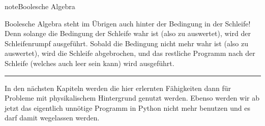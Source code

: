 \documentclass[letterpaper,10pt,english]{jupyterBook}
\begin{document}
\begin{sphinxadmonition}{note}{Boolesche Algebra}

\sphinxAtStartPar
Boolesche Algebra steht im Übrigen auch hinter der Bedingung in der \sphinxhyphen{}Schleife! Denn solange die Bedingung der Schleife wahr ist (also zu  auswertet), wird der Schleifenrumpf ausgeführt. Sobald die Bedingung nicht mehr wahr ist (also zu  auswertet), wird die Schleife abgebrochen, und das restliche Programm nach der Schleife (welches auch leer sein kann) wird ausgeführt.
\end{sphinxadmonition}


\bigskip\hrule\bigskip


\sphinxAtStartPar
{} In den nächsten Kapiteln werden die hier erlernten Fähigkeiten dann für Probleme mit physikalischem Hintergrund genutzt werden. Ebenso werden wir ab jetzt das eigentlich unnötige \sphinxhyphen{}Programm in Python nicht mehr benutzen und es darf damit wegelassen werden.







\renewcommand{\indexname}{Index}
\printindex
\end{document}
